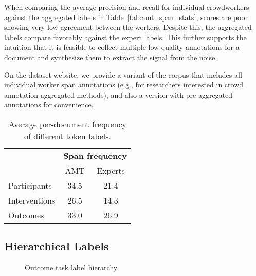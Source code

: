 \documentclass[11pt,a4paper]{article}
\begin{document}
When comparing the average precision and recall for individual crowdworkers against the aggregated labels in Table~\ref{tab:amt_span_stats}, scores are poor showing very low agreement between the workers.
Despite this, the aggregated labels compare favorably against the expert labels. This further supports the intuition that it is feasible to collect multiple low-quality annotations for a document and synthesize them to extract the signal from the noise.

On the dataset website, we provide a variant of the corpus that includes all individual worker span annotations (e.g., for researchers interested in crowd annotation aggregated methods), and also a version with pre-aggregated annotations for convenience.











\begin{table}[h]\centering
    \small
    \begin{tabular}{ l c c } 
& \multicolumn{2}{l}{\textbf{Span frequency}} \\
        \textbf{} & AMT & Experts \\
        \cline{2-3}
        Participants  & 34.5 & 21.4 \\
        Interventions & 26.5 & 14.3 \\ 
        Outcomes      & 33.0 & 26.9 \\ 
\end{tabular}
    \caption{Average per-document frequency of different token labels.}
   	\label{tab:span_label_freq}
\end{table}

\subsection{Hierarchical Labels}
\begin{figure}
\centering
\small
\label{o_labels}
\caption{Outcome task label hierarchy}
\label{fig:outcome-hierarchy}
\end{figure}
\end{document}
